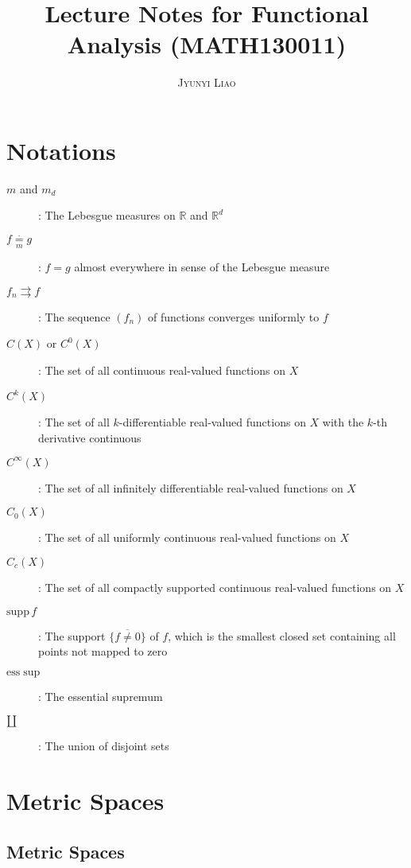 \documentclass{article}
\title{\bf Lecture Notes for Functional Analysis (MATH130011)}
\author{\textsc{Jyunyi Liao}}
\date{}
\newcommand{\supp}{\mathrm{supp}\,}
\newcommand{\esssup}{\mathrm{ess}\sup}
\begin{document}
\maketitle
\tableofcontents
\newpage

\setcounter{section}{-1}
\section{Notations}
\begin{description}
	\item[$m$ and $m_d$]: The Lebesgue measures on $\mathbb{R}$ and $\mathbb{R}^d$
	\item[$f\underset{m}{\overset{\cdot}{=}}g$]: $f=g$ almost everywhere in sense of the Lebesgue measure
	\item[$f_n\rightrightarrows f$]: The sequence $(f_n)$ of functions converges uniformly to $f$
	\item[$C(X)$ or $C^0(X)$]: The set of all continuous real-valued functions on $X$
	\item[$C^k(X)$]: The set of all $k$-differentiable real-valued functions on $X$ with the $k$-th derivative continuous
	\item[$C^\infty(X)$]: The set of all infinitely differentiable real-valued functions on $X$
	\item[$C_0(X)$]: The set of all uniformly continuous real-valued functions on $X$
	\item[$C_c(X)$]: The set of all compactly supported continuous real-valued functions on $X$
	\item[$\supp f$]: The support $\overline{\{f\neq 0\}}$ of $f$, which is the smallest closed set containing all points not mapped to zero
	\item[$\esssup$]: The essential supremum
	\item[$\amalg$]: The union of disjoint sets
\end{description}

\newpage
\section{Metric Spaces}
\subsection{Metric Spaces}
\end{document}
